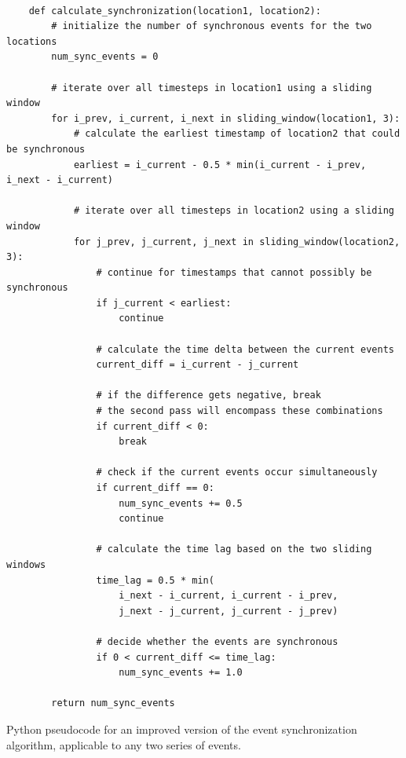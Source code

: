\begin{listing}[H]
  \begin{verbatim}

    def calculate_synchronization(location1, location2):
        # initialize the number of synchronous events for the two locations
        num_sync_events = 0

        # iterate over all timesteps in location1 using a sliding window
        for i_prev, i_current, i_next in sliding_window(location1, 3):
            # calculate the earliest timestamp of location2 that could be synchronous
            earliest = i_current - 0.5 * min(i_current - i_prev, i_next - i_current)

            # iterate over all timesteps in location2 using a sliding window
            for j_prev, j_current, j_next in sliding_window(location2, 3):
                # continue for timestamps that cannot possibly be synchronous
                if j_current < earliest:
                    continue

                # calculate the time delta between the current events
                current_diff = i_current - j_current

                # if the difference gets negative, break
                # the second pass will encompass these combinations
                if current_diff < 0:
                    break

                # check if the current events occur simultaneously
                if current_diff == 0:
                    num_sync_events += 0.5
                    continue

                # calculate the time lag based on the two sliding windows
                time_lag = 0.5 * min(
                    i_next - i_current, i_current - i_prev,
                    j_next - j_current, j_current - j_prev)

                # decide whether the events are synchronous
                if 0 < current_diff <= time_lag:
                    num_sync_events += 1.0

        return num_sync_events

  \end{verbatim}
  \caption{Python pseudocode for an improved version of the event synchronization algorithm, applicable to any two series of events.}
  \label{lst:event_synchronization_improved}
\end{listing}

